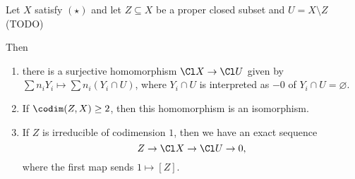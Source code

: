 Let $X$ satisfy $(\star)$ and let $Z \subseteq X$ be a proper closed subset and $U = X\setminus Z$ (TODO)

Then
\begin{enumerate}
	\item there is a surjective homomorphism $\Cl X\to \Cl U$ given by
		$\sum n_iY_i\mapsto \sum n_i(Y_i\cap U)$, where $Y_i\cap U$ is interpreted as $-0$
		of $Y_i\cap U = \varnothing$.
	\item If $\codim(Z, X) \geq 2$, then this homomorphism is an isomorphism.
	\item If $Z$ is irreducible of codimension $1$, then we have an exact sequence
		\[ Z\to \Cl X\to \Cl U\to 0, \]
		where the first map sends $1 \mapsto [Z]$.
\end{enumerate}
